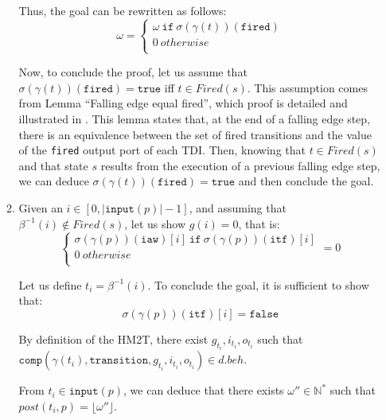\begin{pf}
\begin{itemize}
\begin{enumerate}
     \noindent{}Thus, the goal can be rewritten as follows:
     \begin{equation*}
       \boxed{       \omega=
         \begin{cases}
           \omega~\mathtt{if}~\sigma(\gamma(t))(\texttt{fired}) \\
           0~otherwise \\
         \end{cases}
       }
     \end{equation*}
   
     Now, to conclude the proof, let us assume that
     $\sigma(\gamma(t))(\texttt{fired})=\mathtt{true}$ iff
     $t\in{}Fired(s)$. This assumption comes from Lemma ``Falling edge
     equal fired'', which proof is detailed and illustrated in
     \cite[p.220]{Iampietro2021}. This lemma states that, at the end
     of a falling edge step, there is an equivalence between the set
     of fired transitions and the value of the \texttt{fired} output
     port of each TDI. Then, knowing that $t\in{}Fired(s)$ and that
     state $s$ results from the execution of a previous falling edge
     step, we can deduce
     $\sigma(\gamma(t))(\texttt{fired})=\mathtt{true}$ and then
     conclude the goal.
     
   \item Given an $i\in[0,\vert\mathtt{input}(p)\vert-1]$, and
     assuming that $\beta^{-1}(i)\notin{}Fired(s)$, let us show
     $g(i)=0$, that is:
     \begin{equation*}
       \boxed{
         \begin{cases}
           \sigma(\gamma(p))(\texttt{iaw})[i]~\mathtt{if}~\sigma(\gamma(p))(\texttt{itf})[i] \\
           0~otherwise \\
         \end{cases}=0
       }
     \end{equation*}

     Let us define $t_i=\beta^{-1}(i)$. To conclude the goal, it is sufficient to show that:
     \begin{equation*}
       \boxed{\sigma(\gamma(p))(\mathtt{itf})[i]=\mathtt{false}}
     \end{equation*}

     By definition of the HM2T, there exist
     $g_{t_i}, i_{t_i}, o_{t_i}$ such that
     $\mathtt{comp}(\gamma(t_i), \mathtt{transition}, g_{t_i},
     i_{t_i}, o_{t_i})\in{}d.beh$.

     From $t_i\in\mathtt{input}(p)$, we can deduce that there exists
     $\omega''\in\mathbb{N}^{*}$ such that
     $post(t_i, p)=\lfloor\omega''\rfloor$.


\end{enumerate}
\end{itemize}
\end{pf}
